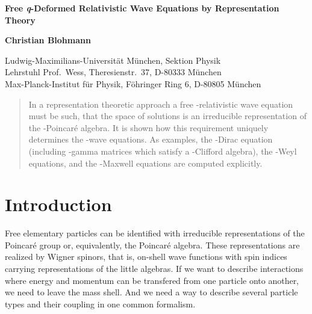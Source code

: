 \documentclass[12pt,a4paper]{article}
\begin{document}

\vspace{4em}
\begin{center}

{\Large{\bf Free \textit{q}-Deformed Relativistic Wave Equations by
  Representation Theory}}

\vspace{3em}

\textbf{Christian Blohmann}

\vspace{1em}

Ludwig-Maximilians-Universit\"at M\"unchen, Sektion Physik\\
Lehrstuhl Prof.\ Wess, Theresienstr.\ 37, D-80333 M\"unchen\\[1em]

Max-Planck-Institut f\"ur Physik,
        F\"ohringer Ring 6, D-80805 M\"unchen\\[1em]

\end{center}

\vspace{1em}

\begin{abstract}
  In a representation theoretic approach a free \coordHE{}-relativistic wave
  equation must be such, that the space of solutions is an irreducible
  representation of the \coordHE{}-Poincar{\'e} algebra. It is shown how this
  requirement uniquely determines the \coordHE{}-wave equations. As examples,
  the \coordHE{}-Dirac equation (including \coordHE{}-gamma matrices which satisfy a
  \coordHE{}-Clifford algebra), the \coordHE{}-Weyl equations, and the \coordHE{}-Maxwell
  equations are computed explicitly.
\end{abstract}

\section{Introduction}

Free elementary particles can be identified with irreducible
representations of the Poincar{\'e} group \cite{Wigner:1939} or,
equivalently, the Poincar{\'e} algebra. These representations are
realized by Wigner spinors, that is, on-shell wave functions with spin
indices carrying representations of the little algebras. If we want to
describe interactions where energy and momentum can be transfered from
one particle onto another, we need to leave the mass shell. And we
need a way to describe several particle types and their coupling in
one common formalism.
\end{document}
